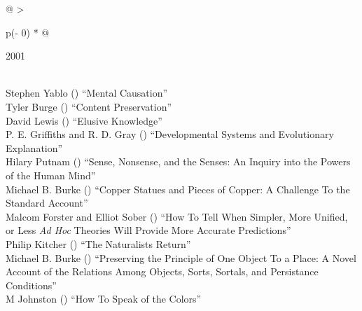 \documentclass[
  10pt,
  letterpaper,
  DIV=11,
  numbers=noendperiod,
  twoside]{scrartcl}
\begin{document}
\begin{longtable}[]{@{}
  >{\raggedright\arraybackslash}p{(\columnwidth - 0\tabcolsep) * }@{}}

\caption{\label{tbl-top-ten-1992}Most cited articles published less than
ten years ago as of 2001.}

\tabularnewline

\toprule\noalign{}
\begin{minipage}[b]{\linewidth}\raggedright
2001
\end{minipage} \\
\midrule\noalign{}
\endhead
\bottomrule\noalign{}
\endlastfoot
Stephen Yablo
()
``Mental Causation'' \\
Tyler Burge
()
``Content Preservation'' \\
David Lewis
()
``Elusive Knowledge'' \\
P. E. Griffiths and R. D. Gray
()
``Developmental Systems and Evolutionary Explanation'' \\
Hilary Putnam
()
``Sense, Nonsense, and the Senses: An Inquiry into the Powers of the
Human Mind'' \\
Michael B. Burke
()
``Copper Statues and Pieces of Copper: A Challenge To the Standard
Account'' \\
Malcom Forster and Elliot Sober
()
``How To Tell When Simpler, More Unified, or Less \emph{Ad Hoc} Theories
Will Provide More Accurate Predictions'' \\
Philip Kitcher
()
``The Naturalists Return'' \\
Michael B. Burke
()
``Preserving the Principle of One Object To a Place: A Novel Account of
the Relations Among Objects, Sorts, Sortals, and Persistance
Conditions'' \\
M Johnston
()
``How To Speak of the Colors'' \\

\end{longtable}
\end{document}
